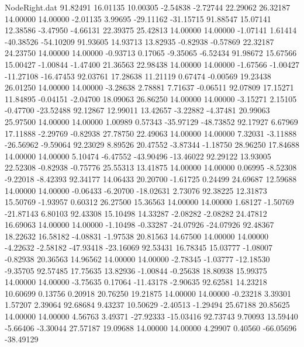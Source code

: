 \begin{filecontents}{NodeRight.dat}
  91.82491   16.01135   10.00305    -2.54838   -2.72744   22.29062   26.32187   14.00000   14.00000   -2.01135    3.99695  -29.11162  -31.15715
  91.88547   15.07141   12.38586    -3.47950   -4.66131   22.39375   25.42813   14.00000   14.00000   -1.07141    1.61414  -40.38526  -54.10209
  91.93605   14.93713   13.82935    -0.82938   -0.57869   22.32187   24.23750   14.00000   14.00000   -0.93713    0.17065   -9.35065   -6.52434
  91.98672   15.67566   15.00427    -1.00844   -1.47400   21.36563   22.98438   14.00000   14.00000   -1.67566   -1.00427  -11.27108  -16.47453
  92.03761   17.28638   11.21119     0.67474   -0.00569   19.23438   26.01250   14.00000   14.00000   -3.28638    2.78881    7.71637   -0.06511
  92.07809   17.15271   11.84895    -0.04151   -2.04700   18.09063   26.86250   14.00000   14.00000   -3.15271    2.15105   -0.47700  -23.52488
  92.12867   12.99011   13.42657    -3.22882   -4.37481   20.99063   25.97500   14.00000   14.00000    1.00989    0.57343  -35.97129  -48.73852
  92.17927    6.67969   17.11888    -2.29769   -0.82938   27.78750   22.49063   14.00000   14.00000    7.32031   -3.11888  -26.56962   -9.59064
  92.23029    8.89526   20.47552    -3.87344   -1.18750   28.96250   17.84688   14.00000   14.00000    5.10474   -6.47552  -43.90496  -13.46022
  92.29122   13.93005   22.52308    -0.82938   -0.75776   25.55313   13.41875   14.00000   14.00000    0.06995   -8.52308   -9.22018   -8.42393
  92.34177   14.06433   20.20700    -1.61725    0.24499   24.69687   12.59688   14.00000   14.00000   -0.06433   -6.20700  -18.02631    2.73076
  92.38225   12.31873   15.50769    -1.93957    0.60312   26.27500   15.36563   14.00000   14.00000    1.68127   -1.50769  -21.87143    6.80103
  92.43308   15.10498   14.33287    -2.08282   -2.08282   24.47812   16.69063   14.00000   14.00000   -1.10498   -0.33287  -24.07926  -24.07926
  92.48367   18.22632   16.58182    -4.08831   -1.97538   20.81563   14.67500   14.00000   14.00000   -4.22632   -2.58182  -47.93418  -23.16069
  92.53431   16.78345   15.03777    -1.08007   -0.82938   20.36563   14.96562   14.00000   14.00000   -2.78345   -1.03777  -12.18530   -9.35705
  92.57485   17.75635   13.82936    -1.00844   -0.25638   18.80938   15.99375   14.00000   14.00000   -3.75635    0.17064  -11.43178   -2.90635
  92.62581   14.23218   10.60699     0.13756    0.20918   20.76250   19.21875   14.00000   14.00000   -0.23218    3.39301    1.57207    2.39064
  92.68684    9.43237   10.50629    -2.40513   -1.29494   25.67188   20.85625   14.00000   14.00000    4.56763    3.49371  -27.92333  -15.03416
  92.73743    9.70093   13.59440    -5.66406   -3.30044   27.57187   19.09688   14.00000   14.00000    4.29907    0.40560  -66.05696  -38.49129

\end{filecontents}
